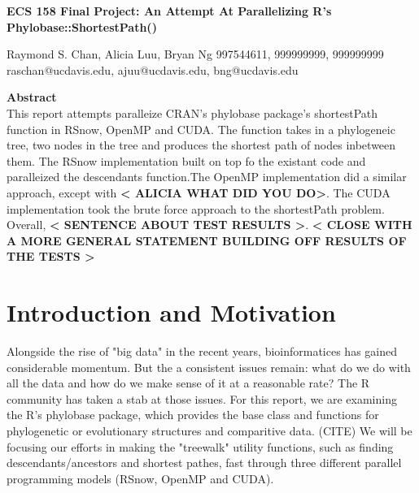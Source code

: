 \documentclass[11pt,letterpaper]{article}
\begin{document}
\begin{center}
{\huge \textbf{ECS 158 Final Project: An Attempt At Parallelizing R's Phylobase::ShortestPath()}\\
\vspace{5mm}
\begin{Large}
Raymond S. Chan, Alicia Luu, Bryan Ng
997544611, 999999999, 999999999\\
raschan@ucdavis.edu, ajuu@ucdavis.edu, bng@ucdavis.edu\\
\end{Large}}
\end{center}


\vspace{5mm}

\begin{center}
	\begin{large}
		\textbf{Abstract}\\
		This report attempts paralleize CRAN's phylobase package's shortestPath function in RSnow, OpenMP and CUDA. The function takes in a phylogeneic tree, two nodes in the tree and produces the shortest path of nodes inbetween them. The RSnow implementation built on top fo the existant code and paralleized the descendants function.The OpenMP implementation did a similar approach, except with \textbf{< ALICIA WHAT DID YOU DO>}. The CUDA implementation took the brute force approach to the  shortestPath problem. Overall, \textbf{< SENTENCE ABOUT TEST RESULTS >}. \textbf{< CLOSE WITH A MORE GENERAL STATEMENT BUILDING OFF RESULTS OF THE TESTS >} 
	\end{large}
	

\end{center}

\section{Introduction and Motivation}
 
Alongside the rise of "big data" in the recent years, bioinformatices has gained considerable momentum. But the a consistent issues remain: what do we do with all the data and how do we make sense of it at a reasonable rate? The R community has taken a stab at those issues. For this report, we are examining the R's phylobase package, which provides the base class and functions for phylogenetic or evolutionary structures and comparitive data. (CITE) We will be focusing our efforts in making the "treewalk" utility functions, such as finding descendants/ancestors and shortest pathes, fast through three different parallel programming models (RSnow, OpenMP and CUDA).  
\end{document}
